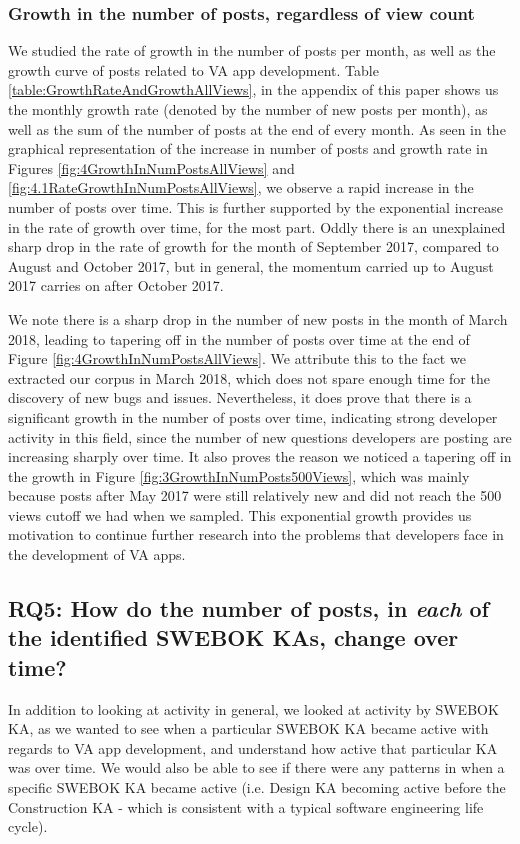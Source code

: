 \documentclass{sigchi}
\begin{document}
\subsubsection{Growth in the number of posts, regardless of view count}
We studied the rate of growth in the number of posts per month, as well as the growth curve of posts related to VA app development. 
Table \ref{table:GrowthRateAndGrowthAllViews}, in the appendix of this paper shows us the monthly growth rate (denoted by the number of new posts per month), as well as the sum of the number of posts at the end of every month. As seen in the graphical representation of the increase in number of posts and growth rate in  Figures \ref{fig:4GrowthInNumPostsAllViews} and \ref{fig:4.1RateGrowthInNumPostsAllViews}, 
we observe a rapid increase in the number of posts over time. This is further supported by the exponential increase in the rate of growth over time, for the most part. Oddly there is an unexplained sharp drop in the rate of growth for the month of September 2017, compared to August and October 2017, but in general, the momentum carried up to August 2017 carries on after October 2017.

We note there is a sharp drop in the number of new posts in the month of March 2018, leading to tapering off in the number of posts over time at the end of Figure \ref{fig:4GrowthInNumPostsAllViews}. We attribute this to the fact we extracted our corpus in March 2018, which does not spare enough time for the discovery of new bugs and issues.
Nevertheless, it does prove that there is a significant growth in the number of posts over time, indicating strong developer activity in this field, since the number of new questions developers are posting are increasing sharply over time. It also proves the reason we noticed a tapering off in the growth in Figure \ref{fig:3GrowthInNumPosts500Views}, which was mainly because posts after May 2017 were still relatively new and did not reach the 500 views cutoff we had when we sampled. This exponential growth provides us motivation to continue further research into the problems that developers face in the development of VA apps.

\subsection{RQ5: How do the number of posts, in \textit{each} of the identified SWEBOK KAs, change over time?}
In addition to looking at activity in general, we looked at activity by SWEBOK KA, as we wanted to see when a particular SWEBOK KA became active with regards to VA app development, and understand how active that particular KA was over time. 
We would also be able to see if there were any patterns in when a specific SWEBOK KA became active (i.e. Design KA becoming active before the Construction KA - which is consistent with a typical software engineering life cycle).
\end{document}
